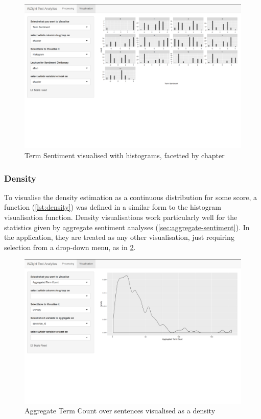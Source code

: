 \message{ !name(jason-cairns-dissertation.tex)}\documentclass[11pt, a4paper, titlepage]{report}
\begin{document}
\begin{figure}
\centering
\includegraphics[scale=0.35]{visualisation-term-sentiment-hist-facet.png}
\caption{Term Sentiment visualised with histograms, facetted by chapter\label{fig:visualisation-term-sentiment-hist-facet}}
\end{figure}

\subsubsection{Density}\label{sec:density}

To visualise the density estimation as a continuous distribution for
some score, a function (\cref{lst:density}) was defined in a similar
form to the histogram visualisation function. Density visualisations
work particularly well for the statistics given by aggregate sentiment
analyses (\cref{sec:aggregate-sentiment}). In the application, they
are treated as any other visualisation, just requiring selection from
a drop-down menu, as in
\cref{fig:visualisation-agg-term-count-density}.

\begin{figure}
\centering
\includegraphics[scale=0.35]{visualisation-agg-term-count-density.png}
\caption{Aggregate Term Count over sentences visualised as a density\label{fig:visualisation-agg-term-count-density}}
\end{figure}
\end{document}
